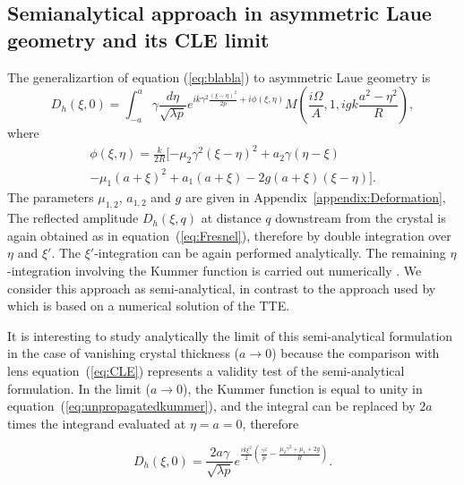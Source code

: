 \documentclass[preprint]{iucr}              %
\begin{document}
\subsection{Semianalytical approach in asymmetric Laue geometry and its CLE limit}
\label{sec:LaueCompatibilityCLE}

The generalizartion of equation (\ref{eq:blabla}) to asymmetric Laue geometry is \cite{GuigayFerrero2016}
\begin{equation}
\label{eq:unpropagatedkummer}
    D_h(\xi,0) = 
    \int_{-a}^{a} \gamma\frac{d\eta}{\sqrt{\lambda p}}
    e^{i k \gamma^2
    \frac{(\xi-\eta)^2}{2p}+i \phi(\xi,\eta)
    }
     M(\frac{i\Omega}{A},1,i g k \frac{a^2-\eta^2}{R}),
\end{equation}
where 
\begin{multline}
    \phi(\xi,\eta) =\frac{k}{2R}[-\mu_2\gamma^2(\xi-\eta)^2
    +a_2\gamma(\eta-\xi) \\
    -\mu_1(a+\xi)^2 
    +a_1(a+\xi)
    -2g(a+\xi)(\xi-\eta)].
\end{multline}
The parameters $\mu_{1,2}$, $a_{1,2}$ and $g$ are given in Appendix~\ref{appendix:Deformation},
The reflected amplitude $D_h(\xi,q)$ at distance $q$ downstream from the crystal is again obtained as in equation~(\ref{eq:Fresnel}), therefore by double integration over $\eta$ and $\xi'$. The $\xi'$-integration can be again performed analytically. The remaining $\eta$-integration involving the Kummer function is carried out numerically \cite{GuigayFerrero2016}. We consider this approach as semi-analytical, in contrast to the approach used by \cite{Nesterets} which is based on a numerical solution of the TTE.

It is interesting to study analytically the limit of this semi-analytical formulation in the case of
vanishing crystal thickness ($a\rightarrow0{}$) because the comparison with lens equation~(\ref{eq:CLE}) represents a validity test of the semi-analytical formulation. 
In the limit ($a\rightarrow0{}$),
the Kummer function is equal to unity in equation~(\ref{eq:unpropagatedkummer}), and the integral can be replaced by $2a$ times the integrand evaluated at $\eta=a=0$, therefore


\begin{equation}
\label{eq:14reduced}
    D_h(\xi,0) = \frac{2 a \gamma}{\sqrt{\lambda p}} e^{\frac{i k \xi^2}{2}(\frac{\gamma^2}{p}-\frac{\mu_2\gamma^2+\mu_1+2g}{R})}.
\end{equation}
\end{document}
